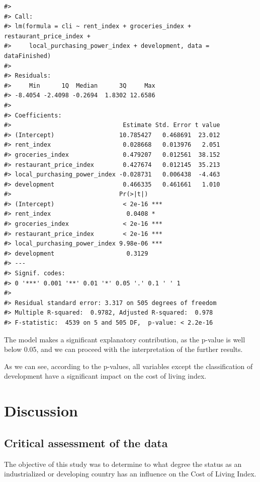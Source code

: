 \documentclass[
  11pt,
  a4paper,
  twoside]{scrbook}
\begin{document}
\begin{verbatim}
#> 
#> Call:
#> lm(formula = cli ~ rent_index + groceries_index + restaurant_price_index + 
#>     local_purchasing_power_index + development, data = dataFinished)
#> 
#> Residuals:
#>     Min      1Q  Median      3Q     Max 
#> -8.4054 -2.4098 -0.2694  1.8302 12.6586 
#> 
#> Coefficients:
#>                               Estimate Std. Error t value
#> (Intercept)                  10.785427   0.468691  23.012
#> rent_index                    0.028668   0.013976   2.051
#> groceries_index               0.479207   0.012561  38.152
#> restaurant_price_index        0.427674   0.012145  35.213
#> local_purchasing_power_index -0.028731   0.006438  -4.463
#> development                   0.466335   0.461661   1.010
#>                              Pr(>|t|)    
#> (Intercept)                   < 2e-16 ***
#> rent_index                     0.0408 *  
#> groceries_index               < 2e-16 ***
#> restaurant_price_index        < 2e-16 ***
#> local_purchasing_power_index 9.98e-06 ***
#> development                    0.3129    
#> ---
#> Signif. codes:  
#> 0 '***' 0.001 '**' 0.01 '*' 0.05 '.' 0.1 ' ' 1
#> 
#> Residual standard error: 3.317 on 505 degrees of freedom
#> Multiple R-squared:  0.9782, Adjusted R-squared:  0.978 
#> F-statistic:  4539 on 5 and 505 DF,  p-value: < 2.2e-16
\end{verbatim}

The model makes a significant explanatory contribution, as the p-value is well below 0.05, and we can proceed with the interpretation of the further results.

As we can see, according to the p-values, all variables except the classification of development have a significant impact on the cost of living index.

\hypertarget{discussion}{%
\chapter{Discussion}\label{discussion}}

\hypertarget{critical-assessment}{%
\section{Critical assessment of the data}\label{critical-assessment}}

The objective of this study was to determine to what degree the status as an industrialized or developing country has an influence on the Cost of Living Index.
\end{document}
